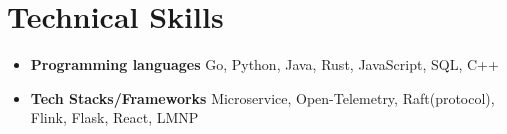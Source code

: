 \documentclass[a4,12pt]{article}
\newenvironment{zitemize}{
\begin{itemize}\itemsep0pt \parskip0pt \parsep1pt}
{\end{itemize}\vspace{-0.5cm}}
\begin{document}
\vspace{-0.4cm}
\section{\textbf{Technical Skills}}
\vspace{-0.2cm}
\begin{zitemize}
    \item \textbf{Programming languages} Go, Python, Java, Rust, JavaScript, SQL, C++
    \item \textbf{Tech Stacks/Frameworks} Microservice, Open-Telemetry, Raft(protocol), Flink, Flask, React, LMNP
\end{zitemize}
\end{document}
